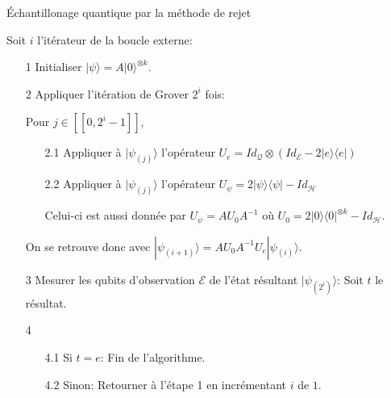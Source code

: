 \begin{algorithm}
\caption{Échantillonage quantique par la méthode de rejet}\label{alg:quant}
\vspace{8pt}
Soit $i$ l'itérateur de la boucle externe:
\begin{itemize}
    \item[1] Initialiser $|\psi \rangle = A|0\rangle^{\otimes k}$.
    \item[2] Appliquer l'itération de Grover $2^i$ fois:
    \item[] Pour $j \in [\![0, 2^i-1]\!]$,
    \begin{itemize}
  	    \item[2.1] Appliquer à $|\psi_{(j)}\rangle$ l'opérateur
   	    $
   	    U_{e} = Id_{\mathcal{Q}} \otimes (Id_{\mathcal{E}} -  2|e \rangle \langle e| )
   	    $
   	    \item[2.2] Appliquer à $|\psi_{(j)}\rangle$ l'opérateur
    	$
   	    U_{\psi} = 2|\psi\rangle \langle \psi | - Id_{\mathcal{H}}
   	    $
        \item[]Celui-ci est aussi donnée par 
    	$
    	U_{\psi} = AU_{0}A^{-1}
   	    $
    	où $U_{0} = 2|0\rangle \langle 0|^{\otimes k} - Id_{\mathcal{H}}$.
    \end{itemize}
    \item[] On se retrouve donc avec $|\psi_{(i+1)}\rangle = AU_{0}A^{-1}U_{e} |\psi_{(i)} \rangle$.
    \item[3] Mesurer les qubits d'observation $\mathcal{E}$ de l'état résultant $|\psi_{(2^i)} \rangle$: Soit $t$ le résultat.
	\item[4]
	\begin{itemize}
   	 \item[4.1] Si $t=e$: Fin de l'algorithme.
   	 \item[4.2] Sinon: Retourner à l'étape 1 en incrémentant $i$ de $1$.
    \end{itemize}
\end{itemize}
\end{algorithm}

